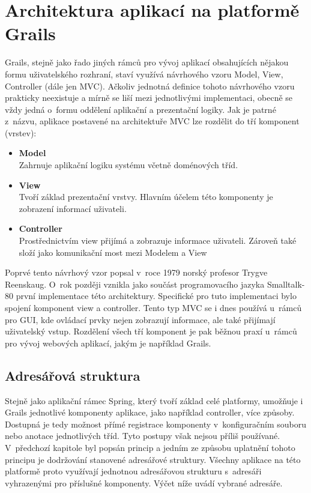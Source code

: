 \chapter{Architektura aplikací na platformě Grails}
Grails, stejně jako řado jiných rámců pro vývoj aplikací obsahujících nějakou formu uživatelského rozhraní, staví využívá návrhového vzoru Model, View, Controller (dále jen MVC). Ačkoliv jednotná definice tohoto návrhového vzoru prakticky neexistuje a mírně se liší mezi jednotlivými implementaci, obecně se vždy jedná o~formu oddělení aplikační a prezentační logiky. Jak je patrné z~názvu, aplikace postavené na architektuře MVC lze rozdělit do tří komponent (vrstev):

\begin{itemize}
\item \textbf{Model}\\
Zahrnuje aplikační logiku systému včetně doménových tříd.
\item \textbf{View}\\
Tvoří základ prezentační vrstvy. Hlavním účelem této komponenty je zobrazení informací uživateli.
\item \textbf{Controller}\\
Prostřednictvím view  přijímá a zobrazuje informace uživateli. Zároveň také složí jako komunikační most mezi Modelem a View
\end{itemize}

Poprvé tento návrhový vzor popsal v~roce 1979 norský profesor Trygve Reenskaug. O~rok později vznikla jako součást programovacího jazyka Smalltalk-80 první implementace této architektury. Specifické pro tuto implementaci bylo spojení komponent view a controller. Tento typ MVC se i dnes používá u~rámců pro GUI, kde ovládací prvky nejen zobrazují informace, ale také přijímají uživatelský vstup. Rozdělení všech tří komponent je pak běžnou praxí u~rámců pro vývoj webových aplikací, jakým je například Grails.

\section{Adresářová struktura}
Stejně jako aplikační rámec Spring, který tvoří základ celé platformy, umožňuje i Grails jednotlivé komponenty aplikace, jako například controller, více způsoby. Dostupná je tedy možnost přímé registrace komponenty v~konfiguračním souboru nebo anotace jednotlivých tříd. Tyto postupy však nejsou příliš používané. V~předchozí kapitole byl popsán princip   a jedním ze způsobu uplatnění tohoto principu je dodržování stanovené adresářové struktury. Všechny aplikace na této platformě proto využívají jednotnou adresářovou strukturu s~adresáři vyhrazenými pro příslušné komponenty. Výčet níže uvádí vybrané adresáře.


